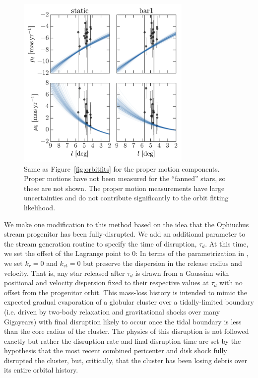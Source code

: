 \documentclass[letterpaper,12pt,preprint]{aastex}
\renewcommand{\changes}[1]{#1}
\begin{document}
\begin{figure}[!tbp]
\begin{center}
\includegraphics[width=0.75\textwidth]{figures/orbitfits-pm}
\caption{ \changes{Same as Figure~\ref{fig:orbitfits} for the proper motion components. Proper motions have not been measured for the ``fanned'' stars, so these are not shown. The proper motion measurements have large uncertainties and do not contribute significantly to the orbit fitting likelihood.}}
\label{fig:orbitfits-pm}
\end{center}
\end{figure}

We make one modification to this method based on the idea that the Ophiuchus stream progenitor has been fully-disrupted. We add an additional parameter to the stream generation routine to specify the time of disruption, $\tau_d$. At this time, we set the offset of the Lagrange point to 0: In terms of the parametrization in \citep{fardal14}, we set $k_r = 0$ and $k_{vt}=0$ but preserve the dispersion in the release radius and velocity. \changes{That is, any star released after $\tau_d$ is drawn from a Gaussian with positional and velocity dispersion fixed to their respective values at $\tau_d$ with no offset from the progenitor orbit.} This mass-loss history is intended to mimic the expected gradual evaporation of a globular cluster over a tidally-limited boundary (i.e. driven by two-body relaxation and gravitational shocks over many Gigayears) with final disruption likely to occur once the tidal boundary is less than the core radius of the cluster. The physics of this disruption is not followed exactly but rather the disruption rate and final disruption time are set by the hypothesis that the most recent combined pericenter and disk shock fully disrupted the cluster, but, critically, that the cluster has been losing debris over its entire orbital history.
\end{document}
